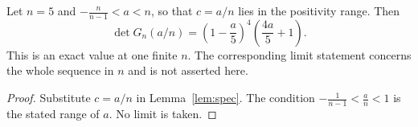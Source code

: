 \begin{theorem}\label{thm:main}
Let $n=5$ and $-\tfrac{n}{n-1}<a<n$, so that $c=a/n$ lies in the positivity range. Then
\[
\det G_n(a/n)=\left(1 - \frac{a}{5}\right)^{4} \left(\frac{4 a}{5} + 1\right).
\]
This is an exact value at one finite $n$. The corresponding limit statement concerns the whole sequence in $n$ and is not asserted here.
\end{theorem}
\begin{proof}
Substitute $c=a/n$ in Lemma~\ref{lem:spec}.
The condition $-\frac1{n-1}<\frac an<1$ is the stated range of $a$.
No limit is taken.
\end{proof}
